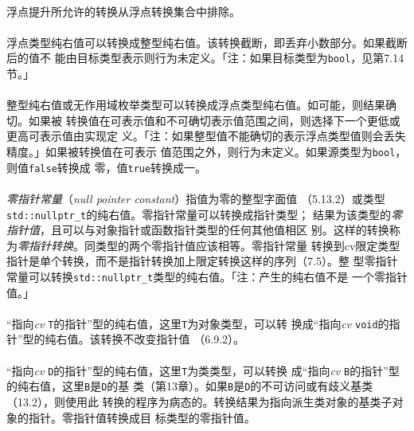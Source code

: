 \paragraph{}
浮点提升所允许的转换从浮点转换集合中排除。

\paragraph{}
浮点类型纯右值可以转换成整型纯右值。该转换截断，即丢弃小数部分。如果截断后的值不
能由目标类型表示则行为未定义。「注：如果目标类型为\texttt{bool}，见第7.14节。」

\paragraph{}
整型纯右值或无作用域枚举类型可以转换成浮点类型纯右值。如可能，则结果确切。如果被
转换值在可表示值和不可确切表示值范围之间，则选择下一个更低或更高可表示值由实现定
义。「注：如果整型值不能确切的表示浮点类型值则会丢失精度。」如果被转换值在可表示
值范围之外，则行为未定义。如果源类型为\texttt{bool}，则值\texttt{false}转换成
零，值\texttt{true}转换成一。

\paragraph{}
\textit{零指针常量}（\textit{null pointer constant}）指值为零的整型字面值
（5.13.2）或类型\texttt{std::nullptr\_t}的纯右值。零指针常量可以转换成指针类型；
结果为该类型的\textit{零指针值}，且可以与对象指针或函数指针类型的任何其他值相区
别。这样的转换称为\textit{零指针转换}。同类型的两个零指针值应该相等。零指针常量
转换到cv限定类型指针是单个转换，而不是指针转换加上限定转换这样的序列（7.5）。整
型零指针常量可以转换\texttt{std::nullptr\_t}类型的纯右值。「注：产生的纯右值不是
一个零指针值。」

\paragraph{}
``指向\textit{cv} \texttt{T}的指针''型的纯右值，这里\texttt{T}为对象类型，可以转
换成``指向\textit{cv} \texttt{void}的指针''型的纯右值。该转换不改变指针值
（6.9.2）。

\paragraph{}
``指向\textit{cv} \texttt{D}的指针''型的纯右值，这里\texttt{T}为类类型，可以转换
成``指向\textit{cv} \texttt{B}的指针''型的纯右值，这里\texttt{B}是\texttt{D}的基
类（第13章）。如果\texttt{B}是\texttt{D}的不可访问或有歧义基类（13.2），则使用此
转换的程序为病态的。转换结果为指向派生类对象的基类子对象的指针。零指针值转换成目
标类型的零指针值。

